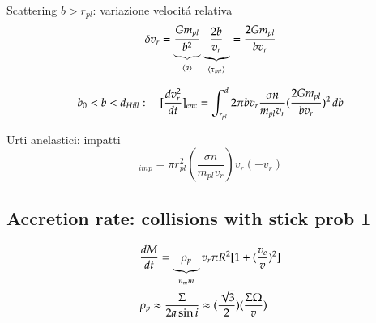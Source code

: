 \documentclass[main.tex]{subfiles}
\begin{document}
{Scattering $b>r_{pl}$: variazione velocit\'a relativa}
\begin{equation*}
\delta v_r=\underbrace{\frac{Gm_{pl}}{b^2}}_{\exv{a}}\underbrace{\frac{2b}{v_r}}_{\exv{\tau_{int}}}=\frac{2Gm_{pl}}{bv_r}
\end{equation*}

\begin{equation*}
b_0<b<d_{Hill}:\quad [\TDy{t}{v_r^2}]_{enc}=\int_{r_{pl}}^d2\pi bv_r\frac{\sigma n}{m_{pl}v_r}(\frac{2Gm_{pl}}{bv_r})^2\,db
\end{equation*}

{Urti anelastici: impatti}
\begin{equation*}
[\TDy{t}{v_r^2}]_{imp}=\pi r_{pl}^2(\frac{\sigma n}{m_{pl}v_r})v_r(-v_r)
\end{equation*}

\subsection{Accretion rate: collisions with stick prob 1}
\begin{align}
&\TDy{t}{M}=\underbrace{\rho_p}_{n_mm}v_r\pi R^2[1+(\frac{v_e}{v})^2]\\
&\rho_p\approx\frac{\Sigma}{2a\sin{i}}\approx(\frac{\sqrt{3}}{2})(\frac{\Sigma\Omega}{v})
\end{align}
\end{document}
